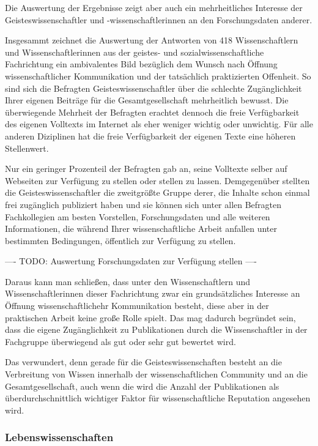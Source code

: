 Die Auswertung der Ergebnisse zeigt aber auch ein mehrheitliches Interesse der Geisteswissenschaftler und -wissenschaftlerinnen an den Forschungsdaten anderer.

Insgesammt zeichnet die Auswertung der Antworten von 418 Wissenschaftlern und Wissenschaftlerinnen aus der geistes- und sozialwissenschaftliche Fachrichtung ein ambivalentes Bild bezüglich dem Wunsch nach Öffnung wissenschaftlicher Kommunikation und der tatsächlich praktizierten Offenheit. So sind sich die Befragten Geisteswissenschaftler über die schlechte Zugänglichkeit Ihrer eigenen Beiträge für die Gesamtgesellschaft mehrheitlich bewusst. Die überwiegende Mehrheit der Befragten erachtet dennoch die freie Verfügbarkeit des eigenen Volltexts im Internet als eher weniger wichtig oder unwichtig. Für alle anderen Diziplinen hat die freie Verfügbarkeit der eigenen Texte eine höheren Stellenwert.

Nur ein geringer Prozenteil der Befragten gab an, seine Volltexte selber auf Webseiten zur Verfügung zu stellen oder stellen zu lassen. Demgegenüber stellten die Geisteswissenschaftler die zweitgrößte Gruppe derer, die Inhalte schon einmal frei zugänglich publiziert haben und sie können sich unter allen Befragten Fachkollegien am besten Vorstellen, Forschungsdaten und alle weiteren Informationen, die während Ihrer wissenschaftliche Arbeit anfallen unter bestimmten Bedingungen, öffentlich zur Verfügung zu stellen.


---- TODO: Auswertung Forschungsdaten zur Verfügung stellen  ----

Daraus kann man schließen, dass unter den Wissenschaftlern und Wissenschaftlerinnen dieser Fachrichtung zwar ein grundsätzliches Interesse an Öffnung wissenschaftlichehr Kommunikation besteht, diese aber in der praktischen Arbeit keine große Rolle spielt. Das mag dadurch begründet sein, dass die eigene Zugänglichkeit zu Publikationen durch die Wissenschaftler in der Fachgruppe überwiegend als gut oder sehr gut bewertet wird.

Das verwundert, denn gerade für die Geisteswissenschaften besteht an die Verbreitung von Wissen innerhalb der wissenschaftlichen Community und an die Gesamtgesellschaft, auch wenn die wird die Anzahl der Publikationen als überdurchschnittlich wichtiger Faktor für wissenschaftliche Reputation angesehen wird.

\subsubsection{Lebenswissenschaften}

